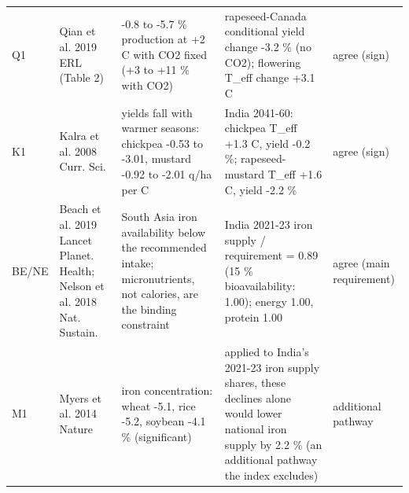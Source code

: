 \begin{minipage}{\textwidth}
{\begin{tabular}{p{0.9cm}p{3.0cm}p{4.4cm}p{4.6cm}p{2.0cm}}
Q1 & Qian et al. 2019 ERL (Table 2) & -0.8 to -5.7 \% production at +2 C with CO2 fixed (+3 to +11 \% with CO2) & rapeseed-Canada conditional yield change -3.2 \% (no CO2); flowering T\_eff change +3.1 C & agree (sign) \\
K1 & Kalra et al. 2008 Curr. Sci. & yields fall with warmer seasons: chickpea -0.53 to -3.01, mustard -0.92 to -2.01 q/ha per C & India 2041-60: chickpea T\_eff +1.3 C, yield -0.2 \%; rapeseed-mustard T\_eff +1.6 C, yield -2.2 \% & agree (sign) \\
BE/NE & Beach et al. 2019 Lancet Planet. Health; Nelson et al. 2018 Nat. Sustain. & South Asia iron availability below the recommended intake; micronutrients, not calories, are the binding constraint & India 2021-23 iron supply / requirement = 0.89 (15 \% bioavailability: 1.00); energy 1.00, protein 1.00 & agree (main requirement) \\
M1 & Myers et al. 2014 Nature & iron concentration: wheat -5.1, rice -5.2, soybean -4.1 \% (significant) & applied to India's 2021-23 iron supply shares, these declines alone would lower national iron supply by 2.2 \% (an additional pathway the index excludes) & additional pathway \\
\bottomrule
\end{tabular}
}
\par\vspace{2pt}{\footnotesize Signs and rank orders only; published values verified in docs/evidence/literature\_comparison\_sources.md; ours computed by code/22\_literature\_comparison.py.}
\end{minipage}
